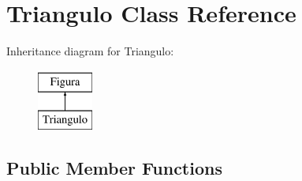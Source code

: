 \hypertarget{class_triangulo}{}\section{Triangulo Class Reference}
\label{class_triangulo}
Inheritance diagram for Triangulo\+:\begin{figure}[H]
\begin{center}
\leavevmode
\includegraphics[height=2.000000cm]{class_triangulo}
\end{center}
\end{figure}
\subsection*{Public Member Functions}
